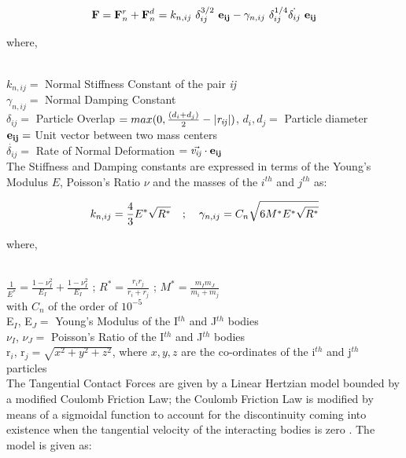 \begin{eqnarray}
{\bf{F}} = {\bf{F}}_n^r + {\bf{F}}_n^d = k_{n,ij}~\delta _{ij}^{3/2}~{\bf{e_{ij}}} - \gamma _{n,ij} ~ \delta _{ij}^{1/4} \dot{\delta _{ij}}~\bf{e_{ij}}  
\end{eqnarray}

{\raggedright{where,}}\\
$k_{n,ij} = $ Normal Stiffness Constant of the pair \textit{ij}\\
$\gamma _{n,ij} = $ Normal Damping Constant\\
$\delta _{ij} = $ Particle Overlap $= max(0, \frac{(d_i + d_j)}{2} - {\bf{|{\it{r_{ij}}}|}})$, $d_i, d_j = $ Particle diameter\\
${\bf{e_{ij}}} = $ Unit vector between two mass centers\\
$\dot{\delta _{ij}} = $ Rate of Normal Deformation $= \vec{\it{v_{ij}}}\cdot {\bf{e_{ij}}}$\\

The Stiffness and Damping constants are expressed in terms of the Young's Modulus $E$, Poisson's Ratio $\nu$ and the masses of the $i^{th}$ and $j^{th}$ as:

\begin{eqnarray}
 k_{n,ij} = \frac{4}{3} E^* \sqrt{R^*} \hspace{0.375cm} ; \hspace{0.375cm} \gamma _{n,ij} = C_n \sqrt{6M^*E^* \sqrt{R^*}}
\end{eqnarray}

{\raggedright{where,}}\\
$\frac{1}{E^*} = \frac{1-\nu_I^2}{E_I}+\frac{1-\nu_I^2}{E_I}$ \hspace{0.375cm} ; \hspace{0.375cm} $R^* = \frac{r_i r_j}{r_i + r_j}$ \hspace{0.375cm} ; \hspace{0.375cm} $M^* = \frac{m_I m_J}{m_i + m_j}$\\
with $C_n$ of the order of $10^{-5}$\\
E$_I$, E$_J =$ Young's Modulus of the I$^{th}$ and J$^{th}$ bodies\\
$\nu_I$, $\nu_J =$ Poisson's Ratio of the I$^{th}$ and J$^{th}$ bodies\\
r$_i$, r$_j =\sqrt{x^2+y^2+z^2}$, where $x,y,z$ are the co-ordinates of the i$^{th}$ and j$^{th}$ particles\\

The Tangential Contact Forces are given by a Linear Hertzian model bounded by a modified Coulomb Friction Law; the Coulomb Friction Law is modified by means of a sigmoidal function to account for the discontinuity coming into existence when the tangential velocity of the interacting bodies is zero \cite{vetsch}. The model is given as:

